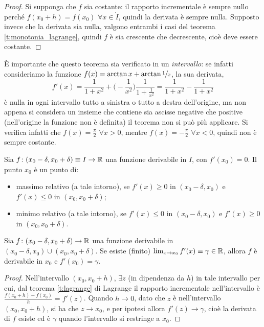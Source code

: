 \begin{proof}
Si supponga che $f$ sia costante: il rapporto incrementale è sempre nullo perché $f(x_0+h)=f(x_0)$ $\forall x\in\mathring{I}$, quindi la derivata è sempre nulla.
Supposto invece che la derivata sia nulla, valgono entrambi i casi del teorema \ref{t:monotonia_lagrange}, quindi $f$ è sia crescente che decrescente, cioè deve essere costante.
\end{proof}
È importante che questo teorema sia verificato in un \emph{intervallo}: se infatti consideriamo la funzione $f(x)=\arctan x+\arctan\sfrac{1}{x}$, la sua derivata,
\[
f'(x)=\frac{1}{1+x^2}+\bigg(\!-\frac1{x^2}\bigg)\frac{1}{1+\frac1{x^2}}=\frac{1}{1+x^2}-\frac{1}{1+x^2}
\]
è nulla in ogni intervallo tutto a sinistra o tutto a destra dell'origine, ma non appena si considera un insieme che contiene sia ascisse negative che positive (nell'origine la funzione non è definita) il teorema non si può più applicare. Si verifica infatti che $f(x)=\frac{\pi}2$ $\forall x>0$, mentre $f(x)=-\frac{\pi}2$ $\forall x<0$, quindi non è sempre costante. 
\begin{corollario}
Sia $f\colon(x_0-\delta,x_0+\delta)\equiv I\to\mathbb{R}$ una funzione derivabile in $I$, con $f'(x_0)=0$. Il punto $x_0$ è un punto di:
\begin{itemize}
\item massimo relativo (a tale intorno), se $f'(x)\geq 0$ in $(x_0-\delta,x_0)$ e $f'(x)\leq 0$ in $(x_0,x_0+\delta)$;
\item minimo relativo (a tale intorno), se $f'(x)\leq 0$ in $(x_0-\delta,x_0)$ e $f'(x)\geq 0$ in $(x_0,x_0+\delta)$.
\end{itemize}
\end{corollario}
\begin{teorema} \label{t:derivata_solo_disc_seconda_specie}
Sia $f\colon(x_0-\delta,x_0+\delta)\to\mathbb{R}$ una funzione derivabile in $(x_0-\delta,x_0)\cup(x_0,x_0+\delta)$. Se esiste (finito) $\lim_{x\to x_0} f'(x)\equiv\gamma\in\mathbb{R}$, allora $f$ è derivabile in $x_0$ e $f'(x_0)=\gamma$.
\end{teorema}
\begin{proof}
Nell'intervallo $(x_0,x_0+h)$, $\exists z$ (in dipendenza da $h$) in tale intervallo per cui, dal teorema \ref{t:lagrange} di Lagrange il rapporto incrementale nell'intervallo è $\frac{f(x_0+h)-f(x_0)}{h}=f'(z)$. Quando $h\to 0$, dato che $z$ è nell'intervallo $(x_0,x_0+h)$, si ha che $z\to x_0$, e per ipotesi allora $f'(z)\to\gamma$, cioè la derivata di $f$ esiste ed è $\gamma$ quando l'intervallo si restringe a $x_0$.
\end{proof}
